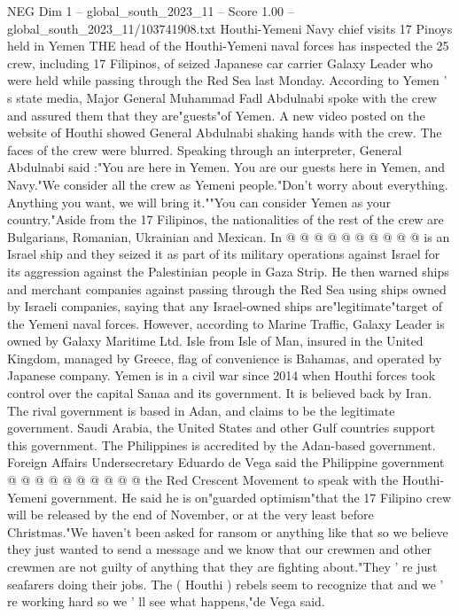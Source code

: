 \begin{textsample}{NEG Dim 1 – global\_south\_2023\_11 – Score 1.00 – global\_south\_2023\_11/103741908.txt}  \label{ex:f1_neg_322}
Houthi-Yemeni Navy chief visits 17 Pinoys held in Yemen THE head of the Houthi-Yemeni naval forces has inspected the 25 crew, including 17 Filipinos, of seized Japanese car carrier Galaxy Leader who were held while passing through the Red Sea last Monday.
According to Yemen ' s state media, Major General Muhammad Fadl Abdulnabi spoke with the crew and assured them that they are"guests"of Yemen.
A new video posted on the website of Houthi showed General Abdulnabi shaking hands with the crew.
The faces of the crew were blurred.
Speaking through an interpreter, General Abdulnabi said :"You are here in Yemen.
You are our guests here in Yemen, and Navy."We consider all the crew as Yemeni people."Don't worry about everything.
Anything you want, we will bring it.""You can consider Yemen as your country."Aside from the 17 Filipinos, the nationalities of the rest of the crew are Bulgarians, Romanian, Ukrainian and Mexican.
In @ @ @ @ @ @ @ @ @ @ is an Israel ship and they seized it as part of its military operations against Israel for its aggression against the Palestinian people in Gaza Strip.
He then warned ships and merchant companies against passing through the Red Sea using ships owned by Israeli companies, saying that any Israel-owned ships are"legitimate"target of the Yemeni naval forces.
However, according to Marine Traffic, Galaxy Leader is owned by Galaxy Maritime Ltd.
Isle from Isle of Man, insured in the United Kingdom, managed by Greece, flag of convenience is Bahamas, and operated by Japanese company.
Yemen is in a civil war since 2014 when Houthi forces took control over the capital Sanaa and its government.
It is believed back by Iran.
The rival government is based in Adan, and claims to be the legitimate government.
Saudi Arabia, the United States and other Gulf countries support this government.
The Philippines is accredited by the Adan-based government.
Foreign Affairs Undersecretary Eduardo de Vega said the Philippine government @ @ @ @ @ @ @ @ @ @ the Red Crescent Movement to speak with the Houthi-Yemeni government.
He said he is on"guarded optimism"that the 17 Filipino crew will be released by the end of November, or at the very least before Christmas."We haven't been asked for ransom or anything like that so we believe they just wanted to send a message and we know that our crewmen and other crewmen are not guilty of anything that they are fighting about."They ' re just seafarers doing their jobs.
The ( Houthi ) rebels seem to recognize that and we ' re working hard so we ' ll see what happens,"de Vega said.

\end{textsample}
